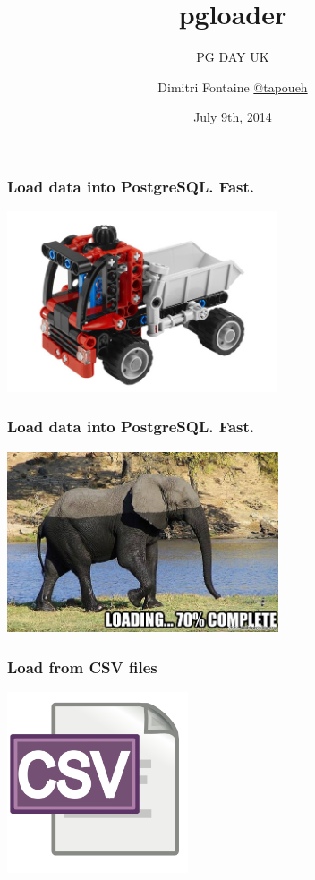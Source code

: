 \documentclass{beamer}
\title{pgloader}
\subtitle{PG DAY UK}
\author{Dimitri Fontaine \linebreak \url{@tapoueh}}
\date{July 9th, 2014}
\begin{document}
\frame{\titlepage}

\begin{frame}
  \frametitle{Load data into PostgreSQL. Fast.}


  \begin{center}
    \includegraphics[height=2.1in]{pgloader.jpg}
  \end{center}
\end{frame}

\begin{frame}
  \frametitle{Load data into PostgreSQL. Fast.}


  \begin{center}
    \includegraphics[height=2.1in]{elephant-loading.jpg}
  \end{center}
\end{frame}

\begin{frame}
  \frametitle{Load from CSV files}


  \begin{center}
    \includegraphics[height=2.1in]{csv_text.png}
  \end{center}
\end{frame}
\end{document}
